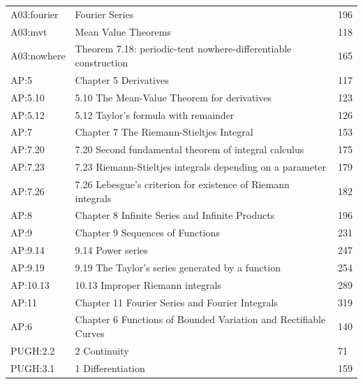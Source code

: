 \documentclass[11pt,oneside,a4paper]{book}
\theoremstyle{definition}
\theoremstyle{remark}
\begin{document}
\begin{longtable}{p{22mm}p{99mm}p{20mm}}
A03:fourier & Fourier Series & 196 \\

A03:mvt & Mean Value Theorems & 118 \\

A03:nowhere & Theorem 7.18: periodic-tent nowhere-differentiable construction & 165 \\

AP:5 & Chapter 5 Derivatives & 117 \\

AP:5.10 & 5.10 The Mean-Value Theorem for derivatives & 123 \\

AP:5.12 & 5.12 Taylor's formula with remainder & 126 \\

AP:7 & Chapter 7 The Riemann-Stieltjes Integral & 153 \\

AP:7.20 & 7.20 Second fundamental theorem of integral calculus & 175 \\

AP:7.23 & 7.23 Riemann-Stieltjes integrals depending on a parameter & 179 \\

AP:7.26 & 7.26 Lebesgue's criterion for existence of Riemann integrals & 182 \\

AP:8 & Chapter 8 Infinite Series and Infinite Products & 196 \\

AP:9 & Chapter 9 Sequences of Functions & 231 \\

AP:9.14 & 9.14 Power series & 247 \\

AP:9.19 & 9.19 The Taylor's series generated by a function & 254 \\

AP:10.13 & 10.13 Improper Riemann integrals & 289 \\

AP:11 & Chapter 11 Fourier Series and Fourier Integrals & 319 \\

AP:6 & Chapter 6 Functions of Bounded Variation and Rectifiable Curves & 140 \\

PUGH:2.2 & 2 Continuity & 71 \\

PUGH:3.1 & 1 Differentiation & 159 \\


\end{longtable}
\end{document}
